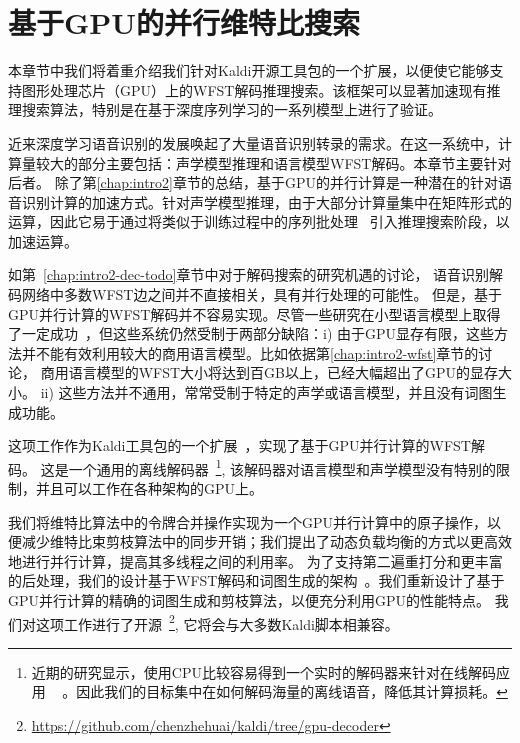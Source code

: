 
\chapter{基于GPU的并行维特比搜索}
\label{chap:gpu}

本章节中我们将着重介绍我们针对Kaldi开源工具包的一个扩展，以便使它能够支持图形处理芯片（GPU）上的WFST解码推理搜索。该框架可以显著加速现有推理搜索算法，特别是在基于深度序列学习的一系列模型上进行了验证。


近来深度学习语音识别的发展唤起了大量语音识别转录的需求。在这一系统中，计算量较大的部分主要包括：声学模型推理和语言模型WFST解码。本章节主要针对后者。
除了第\ref{chap:intro2}章节的总结，基于GPU的并行计算是一种潜在的针对语音识别计算的加速方式。针对声学模型推理，由于大部分计算量集中在矩阵形式的运算，因此它易于通过将类似于训练过程中\cite{vesely2010parallel}的序列批处理~\cite{dixon2009harnessing} 引入推理搜索阶段，以加速运算。

如第~\ref{chap:intro2-dec-todo}章节中对于解码搜索的研究机遇的讨论，
语音识别解码网络中多数WFST边之间并不直接相关，具有并行处理的可能性。
但是，基于GPU并行计算的WFST解码并不容易实现。尽管一些研究在小型语言模型上取得了一定成功~\cite{you2009parallel}，但这些系统仍然受制于两部分缺陷：i) 由于GPU显存有限，这些方法并不能有效利用较大的商用语言模型。比如依据第\ref{chap:intro2-wfst}章节的讨论， 商用语言模型的WFST大小将达到百GB以上，已经大幅超出了GPU的显存大小。
ii) 这些方法并不通用，常常受制于特定的声学或语言模型，并且没有词图生成功能。



这项工作作为Kaldi工具包的一个扩展~\cite{povey2011kaldi}，实现了基于GPU并行计算的WFST解码。
%
这是一个通用的离线解码器~\footnote{近期的研究显示，使用CPU比较容易得到一个实时的解码器来针对在线解码应用
 ~\cite{peddinti2018low,zhc00-chen-tasl2017} 。因此我们的目标集中在如何解码海量的离线语音，降低其计算损耗。},
 该解码器对语言模型和声学模型没有特别的限制，并且可以工作在各种架构的GPU上。
%

我们将维特比算法中的令牌合并操作实现为一个GPU并行计算中的原子操作，以便减少维特比束剪枝算法中的同步开销；我们提出了动态负载均衡的方式以更高效地进行并行计算，提高其多线程之间的利用率。
为了支持第二遍重打分和更丰富的后处理，我们的设计基于WFST解码和词图生成的架构~\cite{povey2012generating}。我们重新设计了基于GPU并行计算的精确的词图生成和剪枝算法，以便充分利用GPU的性能特点。
%
我们对这项工作进行了开源~\footnote{\url{https://github.com/chenzhehuai/kaldi/tree/gpu-decoder}},
它将会与大多数Kaldi脚本相兼容。



